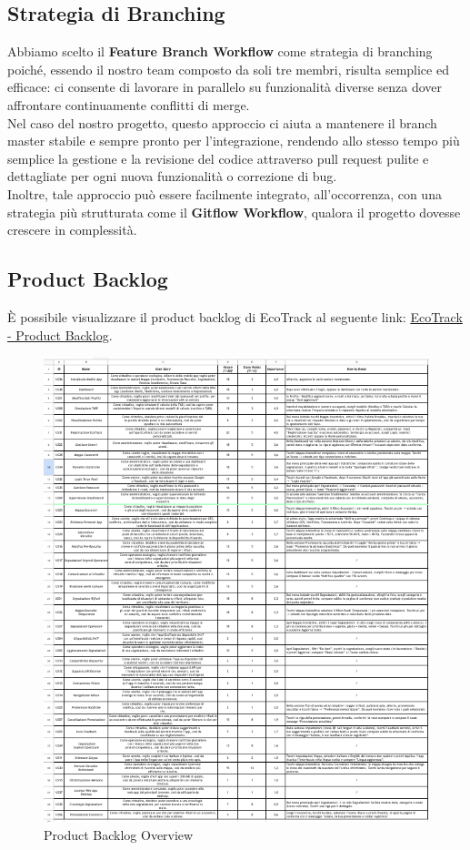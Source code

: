 \subsection{Strategia di Branching}
Abbiamo scelto il \textbf{Feature Branch Workflow} come strategia di branching poiché, essendo il nostro team composto da soli tre membri, risulta semplice ed efficace: ci consente di lavorare in parallelo su funzionalità diverse senza dover affrontare continuamente conflitti di merge. \\Nel caso del nostro progetto, questo approccio ci aiuta a mantenere il branch master stabile e sempre pronto per l’integrazione, rendendo allo stesso tempo più semplice la gestione e la revisione del codice attraverso pull request pulite e dettagliate per ogni nuova funzionalità o correzione di bug. 
\\Inoltre, tale approccio può essere facilmente integrato, all’occorrenza, con una strategia più strutturata come il \textbf{Gitflow Workflow}, qualora il progetto dovesse crescere in complessità.

\subsection{Product Backlog}
È possibile visualizzare il product backlog di EcoTrack al seguente link: \href{https://docs.google.com/spreadsheets/d/124BGyj-mUSipfd_NPPftBozjqdOnjI-apbYR-fjCgLY/edit?usp=sharing}{EcoTrack - Product Backlog}.
\begin{figure}[H]
    \centering
    \includegraphics[width=1\linewidth]{D3-G1//Img/Screenshot Product Backlog.png}
    \caption{Product Backlog Overview}
    \label{fig:enter-label}
\end{figure}


